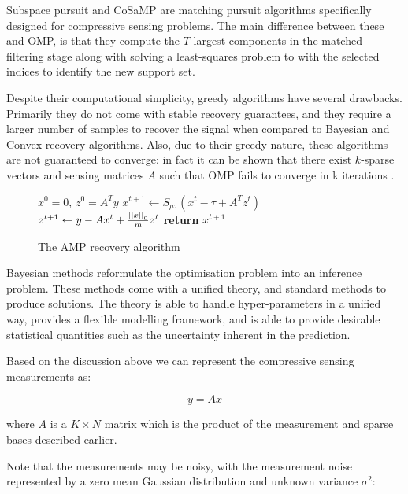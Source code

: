 Subspace pursuit and CoSaMP are matching pursuit algorithms specifically designed for compressive sensing problems. The main difference between these and OMP, is that they compute the \(T\) largest components in the matched filtering stage along with solving a least-squares problem to with the selected indices to identify the new support set.

Despite their computational simplicity, greedy algorithms have several drawbacks. Primarily they do not come with stable recovery guarantees, and they require a larger number of samples to recover the signal when compared to Bayesian and Convex recovery algorithms. Also, due to their greedy nature, these algorithms are not guaranteed to converge: in fact it can be shown that there exist \(k\)-sparse vectors and sensing matrices \(A\) such that OMP fails to converge in k iterations \cite{wen2013improved}.



\begin{figure}
\begin{algorithmic}[1]
\State $x^0 = 0$, $z^0=A^Ty$
\State $x^{t+1} \gets S_{\mu\tau}\left(x^t - \tau+ A^Tz^t\right) $
\State $z^{t+1} \gets y - Ax^t + \frac{\left|\left|x\right|\right|_0}{m}z^t$
\EndWhile
\State \textbf{return} $x^{t+1}$
\EndProcedure
\end{algorithmic}
\caption{The AMP recovery algorithm}\label{alg:amp}
\end{figure}



Bayesian methods reformulate the optimisation problem into an inference problem. These methods come with a unified theory, and standard methods to produce solutions. The theory is able to handle hyper-parameters in a unified way, provides a flexible modelling framework, and is able to provide desirable statistical quantities such as the uncertainty inherent in the prediction.

Based on the discussion above we can represent the compressive sensing measurements as: 

\begin{equation}
y = Ax
\end{equation}

where \(A\) is a \(K \times	N\) matrix which is the product of the measurement and sparse bases described earlier.

Note that the measurements may be noisy, with the measurement noise represented by a zero mean Gaussian distribution and unknown variance \( \sigma^2 \):

